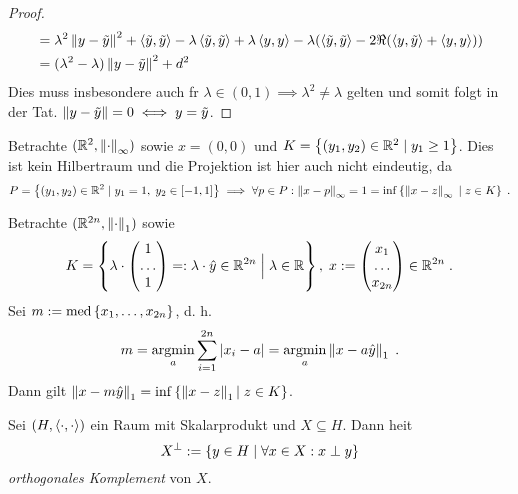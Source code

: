 \begin{proof}
\begin{align*}
	&= \lambda^2 \left\lVert y-\tilde y\right\rVert^2 + \left\langle\tilde y, \tilde y\right\rangle - \lambda \left\langle\tilde y, \tilde y\right\rangle + \lambda \left\langle y, y\right\rangle - \lambda (\left\langle\tilde y, \tilde y\right\rangle -2 \Re(\left\langle y,\tilde y\right\rangle + \left\langle y,y\right\rangle)) \\
	& = (\lambda^2 - \lambda) \left\lVert y-\tilde y\right\rVert^2 + d^2 
	\end{align*}
	Dies muss insbesondere auch f\us r \(\lambda \in (0,1) \implies \lambda^2 \neq \lambda\) gelten und somit folgt in der Tat. \(\left\lVert y-\tilde y\right\rVert = 0 \iff y = \tilde y\).
	\end{proof}
	
	\begin{ex}
		Betrachte \((\mathbb{R}^2, \left\lVert\cdot\right\rVert_\infty)\) sowie \(x = (0,0)\) und \(K = \left\{(y_1, y_2) \in \mathbb{R}^2\;\vert\; y_1 \geq 1\right\}\). Dies ist kein Hilbertraum und die Projektion ist hier auch nicht eindeutig, da 
		\[P = \left\{(y_1, y_2) \in \mathbb{R}^2\;\vert\; y_1 = 1,\; y_2 \in [-1,1]\right\} \implies \forall p \in P: \left\lVert x-p\right\rVert_\infty = 1 = \inf\left\{\left\lVert x-z\right\rVert_\infty \;\vert\; z \in K\right\}\;.\]
	\end{ex}
	
	\begin{ex}
		Betrachte \((\mathbb{R}^{2n},\left\lVert\cdot\right\rVert_{1})\) sowie \[K = \left\{\lambda \cdot \begin{pmatrix}1\\ \ldots\\1 \end{pmatrix} =: \lambda \cdot \hat y\in \mathbb{R}^{2n} \;\Big\vert\; \lambda \in \mathbb{R}\right\},\; x : = \begin{pmatrix}x_1\\ \ldots\\ x_{2n}\end{pmatrix} \in \mathbb{R}^{2n}\;.\] 
		Sei \(m : = \text{med}\left\{x_1,\ldots,x_{2n}\right\}\), d. h. 
		\[m = \underset{a}{\text{argmin}} \sum_{i=1}^{2n}\left\lvert x_i -a \right\rvert =  \underset{a}{\text{argmin}} \left\lVert x -a \hat y\right\rVert_{1}\;.\]
		Dann gilt  \(\left\lVert x-m \hat y\right\rVert_{1} = \inf\left\{\left\lVert x-z\right\rVert_{1}\vert \; z\in K\right\}\).
	\end{ex}
	
	\begin{definition}
		Sei \((H, \left\langle\cdot, \cdot\right\rangle)\) ein Raum mit Skalarprodukt und \(X\subseteq H\). Dann  hei\s t
		\[X^\perp := \left\{y\in H \;\vert\; \forall x \in X: x \perp y\right\}\]
		\textit{orthogonales Komplement} von $X$.
	\end{definition}
	
